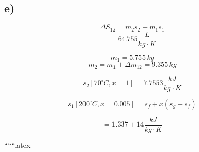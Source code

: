 

\subsection*{e)}

\[
\Delta S_{12} = m_2 s_2 - m_1 s_1
\]
\[
= 64.755 \frac{L}{kg \cdot K}
\]

\[
m_1 = 5.755 \, kg
\]
\[
m_2 = m_1 + \Delta m_{12} = 9.355 \, kg
\]

\[
s_2 [70^\circ C, x=1] = 7.7553 \frac{kJ}{kg \cdot K}
\]

\[
s_1 [200^\circ C, x=0.005] = s_f + x(s_g - s_f)
\]

\[
= 1.337 + 14 \frac{kJ}{kg \cdot K}
\]

``````latex